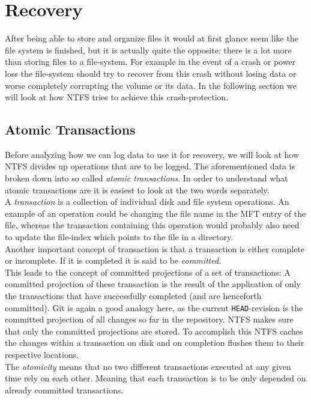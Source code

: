 \section{Recovery}
\label{sec:Recovery}
After being able to store and organize files it would at first glance seem like the file system is finished, but it is actually quite the opposite: there is a lot more than storing files to a file-system. For example in the event of a crash or power loss the file-system should  try to recover from this crash without losing data or worse completely corrupting the volume or its data. In the following section we will look at how NTFS tries to achieve this crash-protection.

\subsection{Atomic Transactions}
Before analyzing how we can log data to use it for recovery, we will look at how NTFS divides up operations that are to be logged. 
The aforementioned data is broken down into so called \textit{atomic transactions}. In order to understand what atomic transactions are it is easiest to look at the two words separately.\\
A \textit{transaction} is a collection of individual disk and file system operations. An example of an operation could be changing the file name in the MFT entry of the file, whereas the transaction containing this operation would probably also need to update the file-index which points to the file in a directory.\\
Another important concept of  transaction is that a transaction is either complete or incomplete. If it is completed it is said to be \textit{committed}.\\ This leads to the concept of committed projections of a set of transactions: A committed projection of these transaction is the result of the application of only the transactions that have successfully completed (and are henceforth committed). Git is again a good analogy here, as the current \texttt{HEAD}-revision is the committed projection of all changes so far in the repository. NTFS makes sure  that only the committed projections are stored. To accomplish this NTFS caches the changes within a transaction on disk and on completion flushes them to their respective locations.\\
The \textit{atomicity} means that no two different transactions executed at any given time rely on each other. Meaning that each transaction is to be only depended on already committed transactions.


